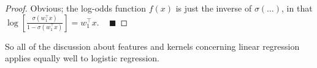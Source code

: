 \begin{proof}
    Obvious; the log-odds function $f(x)$
    is just the inverse of $\sigma(\dots)$, in that
    $\log\left[
        \frac{\sigma(w_1^{\top}x)}{1 - \sigma(w_1^{\top}x)}
    \right] = w_1^{\top}x$.
    ~ $\blacksquare$
\end{proof}

So all of the discussion about features and kernels
concerning linear regression
applies equally well to logistic regression.

